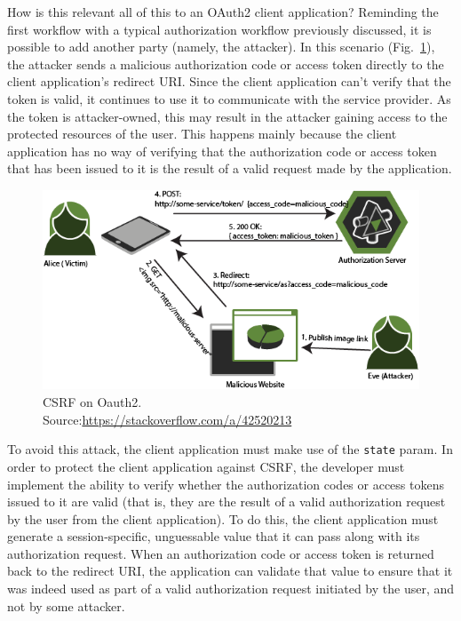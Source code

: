 How is this relevant all of this to an OAuth2 client application? 
Reminding the first workflow with a typical authorization workflow previously discussed, it is possible to add another party (namely, the attacker). In this scenario (Fig.~\ref{fig:csrf}), the attacker sends a malicious authorization code or access token directly to the client application's redirect URI. Since the client application can't verify that the token is valid, it continues to use it to communicate with the service provider. As the token is attacker-owned, this may result in the attacker gaining access to the protected resources of the user.
This happens mainly because the client application has no way of verifying that the authorization code or access token that has been issued to it is the result of a valid request made by the application.

\vspace{1.5cm}

\begin{figure}[ht]
    \centering
    \includegraphics[scale=0.65]{chapters/images/chp4/csrf.png}
    \caption[CSRF on Oauth2]{CSRF on Oauth2.\\\hspace{\textwidth}Source:\hspace{0.2cm}\url{https://stackoverflow.com/a/42520213}}
    \label{fig:csrf}
\end{figure}

\vspace{1.5cm}

To avoid this attack, the client application must make use of the \texttt{state} param.
In order to protect the client application against CSRF, the developer must implement the ability to verify whether the authorization codes or access tokens issued to it are valid (that is, they are the result of a valid authorization request by the user from the client application). To do this, the client application must generate a session-specific, unguessable value that it can pass along with its authorization request. When an authorization code or access token is returned back to the redirect URI, the application can validate that value to ensure that it was indeed used as part of a valid authorization request initiated by the user, and not by some attacker.

